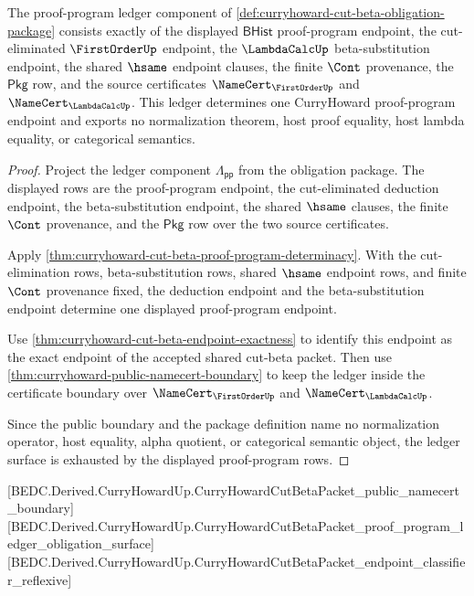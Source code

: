 \begin{theorem}
\label{thm:curryhoward-proof-program-ledger-obligation-surface}
The proof-program ledger component of
\autoref{def:curryhoward-cut-beta-obligation-package} consists exactly of the
displayed $\mathsf{BHist}$ proof-program endpoint, the cut-eliminated
$\FirstOrderUp$ endpoint, the $\LambdaCalcUp$ beta-substitution endpoint, the
shared $\hsame$ endpoint clauses, the finite $\Cont$ provenance, the
$\mathsf{Pkg}$ row, and the source certificates
$\NameCert_{\FirstOrderUp}$ and $\NameCert_{\LambdaCalcUp}$. This ledger
determines one CurryHoward proof-program endpoint and exports no normalization
theorem, host proof equality, host lambda equality, or categorical semantics.
\end{theorem}
\begin{proof}
Project the ledger component $\Lambda_{\mathsf{pp}}$ from the obligation
package. The displayed rows are the proof-program endpoint, the
cut-eliminated deduction endpoint, the beta-substitution endpoint, the shared
$\hsame$ clauses, the finite $\Cont$ provenance, and the $\mathsf{Pkg}$ row
over the two source certificates.

Apply \autoref{thm:curryhoward-cut-beta-proof-program-determinacy}. With the
cut-elimination rows, beta-substitution rows, shared $\hsame$ endpoint rows,
and finite $\Cont$ provenance fixed, the deduction endpoint and the
beta-substitution endpoint determine one displayed proof-program endpoint.

Use \autoref{thm:curryhoward-cut-beta-endpoint-exactness} to identify this
endpoint as the exact endpoint of the accepted shared cut-beta packet. Then
use \autoref{thm:curryhoward-public-namecert-boundary} to keep the ledger
inside the certificate boundary over $\NameCert_{\FirstOrderUp}$ and
$\NameCert_{\LambdaCalcUp}$.

Since the public boundary and the package definition name no normalization
operator, host equality, alpha quotient, or categorical semantic object, the
ledger surface is exhausted by the displayed proof-program rows.
\end{proof}

[BEDC.Derived.CurryHowardUp.CurryHowardCutBetaPacket\_public\_namecert\_boundary]
[BEDC.Derived.CurryHowardUp.CurryHowardCutBetaPacket\_proof\_program\_ledger\_obligation\_surface]
[BEDC.Derived.CurryHowardUp.CurryHowardCutBetaPacket\_endpoint\_classifier\_reflexive]

